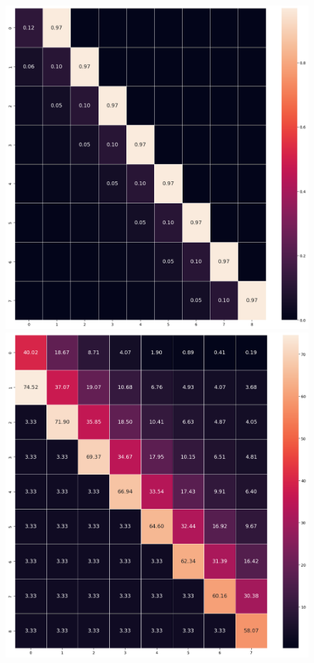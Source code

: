 \documentclass[
  letterpaper,
  11pt,
  english,
  singlespacing,
  headsepline]{MastersDoctoralThesis}
\begin{document}
\begin{figure}
\newline
\begin{minipage}{0.33\linewidth}
\includegraphics{icmr_figures/latent_mfc.png}\end{minipage}%
%
\begin{minipage}{0.33\linewidth}
\includegraphics{icmr_figures/latent_mcf.png}\end{minipage}%

\end{figure}
\end{document}
